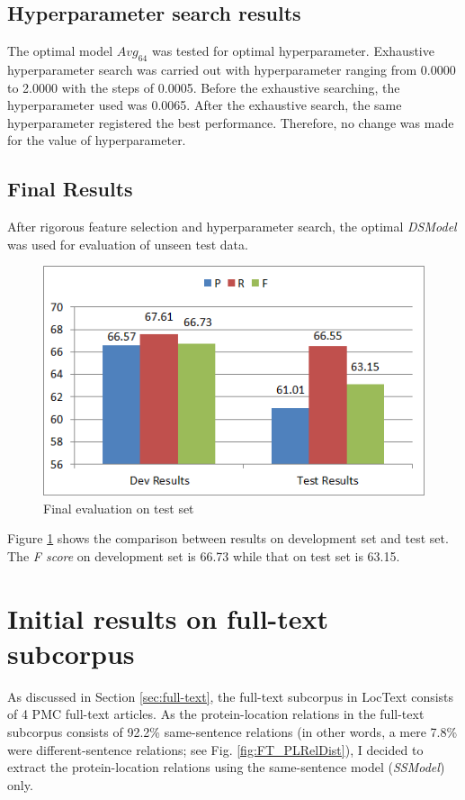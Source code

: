 \subsection{Hyperparameter search results}

The optimal model $Avg_{64}$ was tested for optimal hyperparameter. Exhaustive hyperparameter search was carried out with hyperparameter ranging from 0.0000 to 2.0000 with the steps of 0.0005. Before the exhaustive searching, the hyperparameter used was 0.0065. After the exhaustive search, the same hyperparameter registered the best performance. Therefore, no change was made for the value of hyperparameter.

\subsection{Final Results}

After rigorous feature selection and hyperparameter search, the optimal \textit{DSModel} was used for evaluation of unseen test data.

\begin{figure}
\centering
\includegraphics[scale=0.7]{figures/DSFinalResults.png}
\caption{Final evaluation on test set}\label{fig:DSFinal}
\end{figure}

Figure \ref{fig:DSFinal} shows the comparison between results on development set and test set. The \textit{F score} on development set is 66.73 while that on test set is 63.15.

\section{Initial results on full-text subcorpus} \label{sec:FTPrimaryRes}

As discussed in Section \ref{sec:full-text}, the full-text subcorpus in LocText consists of 4 PMC \cite{pmc} full-text articles. As the protein-location relations in the full-text subcorpus consists of 92.2\% same-sentence relations (in other words, a mere 7.8\% were different-sentence relations; see Fig. \ref{fig:FT_PLRelDist}), I decided to extract the protein-location relations using the same-sentence model (\textit{SSModel}) only.

